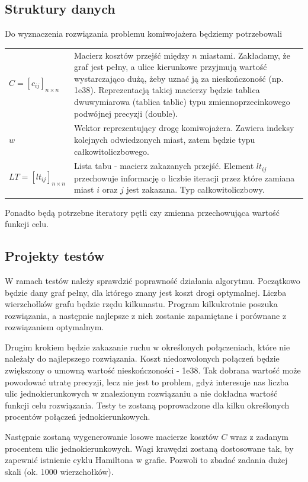 \documentclass[11pt,a4paper,twoside]{article}
\begin{document}
\subsection{Struktury danych}
Do wyznaczenia rozwiązania problemu komiwojażera będziemy potrzebowali
\bgroup
\def\arraystretch{1.5}
\begin{tabularx}{\textwidth}{l|X}
$C = [c_{ij}]_{n\times n}$ & Macierz kosztów przejść między $n$ miastami. Zakładamy, że graf jest pełny, a ulice kierunkowe przyjmują wartość wystarczająco dużą, żeby uznać ją za nieskończoność (np. 1e38). Reprezentacją takiej macierzy będzie tablica dwuwymiarowa (tablica tablic) typu zmiennoprzecinkowego podwójnej precyzji (double).\\
$w$ & Wektor reprezentujący drogę komiwojażera. Zawiera indeksy kolejnych odwiedzonych miast, zatem będzie typu całkowitoliczbowego. \\
$LT = [lt_{ij}]_{n\times n}$ & Lista tabu - macierz zakazanych przejść. Element $lt_{ij}$ przechowuje informację o liczbie iteracji przez które zamiana miast $i$ oraz $j$ jest zakazana. Typ całkowitoliczbowy.\\
\end{tabularx}
\egroup

Ponadto będą potrzebne iteratory pętli czy zmienna przechowująca wartość funkcji celu.

\subsection{Projekty testów}
W ramach testów należy sprawdzić poprawność działania algorytmu. Początkowo będzie dany graf pełny, dla którego znany jest koszt drogi optymalnej. Liczba wierzchołków grafu będzie rzędu kilkunastu. Program kilkukrotnie poszuka rozwiązania, a następnie najlepsze z nich zostanie zapamiętane i porównane z rozwiązaniem optymalnym.

Drugim krokiem będzie zakazanie ruchu w określonych połączeniach, które nie należały do najlepszego rozwiązania. Koszt niedozwolonych połączeń będzie zwiększony o umowną wartość nieskończoności - 1e38. Tak dobrana wartość może powodować utratę precyzji, lecz nie jest to problem, gdyż interesuje nas liczba ulic jednokierunkowych w znalezionym rozwiązaniu a nie dokładna wartość funkcji celu rozwiązania. Testy te zostaną poprowadzone dla kilku określonych procentów połączeń jednokierunkowych.
	
Następnie zostaną wygenerowanie losowe macierze kosztów $C$ wraz z zadanym procentem ulic jednokierunkowych. Wagi krawędzi zostaną dostosowane tak, by zapewnić istnienie cyklu Hamiltona w grafie. Pozwoli to zbadać zadania dużej skali (ok. 1000 wierzchołków).
	
\end{document}
